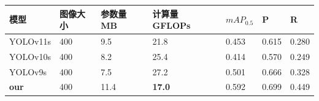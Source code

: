 \begin{table}[H]
    \centering
    \captionsetup{font=footnotesize}
    \label{tab:compare_studies_fogtt100k}
    \begin{tabular}{p{}p{}p{}p{}p{}p{}p{}}
        \toprule
        模型         & 图像大小 & 参数量 MB & 计算量 GFLOPs & $mAP_{0.5}$   & P     & R     \\ 
        \midrule
        YOLOv11s     & 400     & 9.5     & 21.8          & 0.453        & 0.615  & 0.280 \\
        YOLOv10s     & 400     & 8.2     & 25.4          & 0.414        & 0.570  & 0.249 \\
        YOLOv9s      & 400     & 7.5     & 27.2          & 0.501        & 0.666  & 0.328 \\
        \textbf{our} & 400     & 11.4    & \textbf{17.0} & 0.592        & 0.699  & 0.449 \\
        \bottomrule
    \end{tabular}
\end{table}

